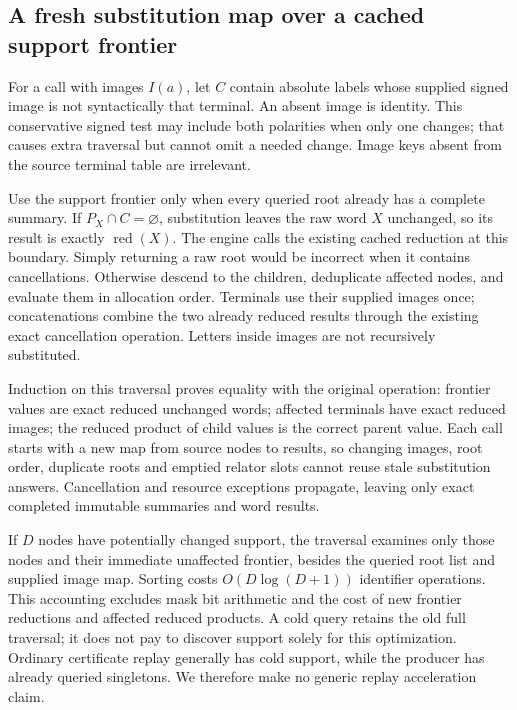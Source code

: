 \subsection{A fresh substitution map over a cached support frontier}

For a call with images $I(a)$, let $C$ contain absolute labels whose supplied
signed image is not syntactically that terminal. An absent image is identity.
This conservative signed test may include both polarities when only one
changes; that causes extra traversal but cannot omit a needed change.
Image keys absent from the source terminal table are irrelevant.

Use the support frontier only when every queried root already has a complete
summary. If $P_X\cap C=\varnothing$, substitution leaves the raw word $X$
unchanged, so its result is exactly $\operatorname{red}(X)$. The engine calls
the existing cached reduction at this boundary. Simply returning a raw root
would be incorrect when it contains cancellations. Otherwise descend to the
children, deduplicate affected nodes, and evaluate them in allocation order.
Terminals use their supplied images once; concatenations combine the two
already reduced results through the existing exact cancellation operation.
Letters inside images are not recursively substituted.

Induction on this traversal proves equality with the original operation:
frontier values are exact reduced unchanged words; affected terminals have
exact reduced images; the reduced product of child values is the correct
parent value. Each call starts with a new map from source nodes to results,
so changing images, root order, duplicate roots and emptied relator slots
cannot reuse stale substitution answers. Cancellation and resource exceptions
propagate, leaving only exact completed immutable summaries and word results.

If $D$ nodes have potentially changed support, the traversal examines only
those nodes and their immediate unaffected frontier, besides the queried root
list and supplied image map. Sorting costs $O(D\log(D+1))$ identifier
operations. This accounting excludes mask bit arithmetic and the cost of
new frontier reductions and affected reduced products. A cold query retains
the old full traversal; it does not pay to discover support solely for this
optimization. Ordinary certificate replay generally has cold support, while
the producer has already queried singletons. We therefore make no generic
replay acceleration claim.

